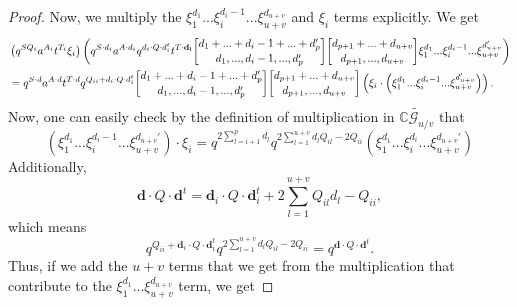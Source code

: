 \documentclass[10pt,a4paper]{amsart}
\begin{document}
\begin{proof}
    Now, we multiply the $\xi_1^{d_1}...\xi_i^{d_i-1}...\xi_{u+v}^{d_{u+v}}$ and $\xi_i$ terms explicitly. We get
    \begin{align*}
    &\left(q^{SQ_i}a^{A_i}t^{T_i}\xi_i\right)\left(q^{S\cdot\textbf{d}_i }a^{A\cdot \textbf{d}_i}q^{\textbf{d}_i\cdot Q\cdot \textbf{d}_i^t} t^{T\cdot\bf{d}_i} {d_1+...+d_i-1+...+d_p'\brack d_1,...,d_i-1,...,d_p'}{d_{p+1}+...+d_{u+v}\brack d_{p+1},...,d_{u+v}}\xi_1^{d_1}...\xi_i^{d_i-1} ...\xi_{u+v}^{d_{u+v}'}\right) \\
    & =q^{S\cdot \textbf{d}}a^{A\cdot \textbf{d}}t^{T\cdot \textbf{d}}q^{Q_{ii}+\textbf{d}_i\cdot Q\cdot \textbf{d}_i^t}{d_1+...+d_i-1+...+d_p'\brack d_1,...,d_i-1,...,d_p'}{d_{p+1}+...+d_{u+v}\brack d_{p+1},...,d_{u+v}}\left(\xi_i\cdot\left(\xi_1^{d_1}...\xi_i^{d_i-1} ...\xi_{u+v}^{d_{u+v}'}\right)\right).
    \end{align*}
    Now, one can easily check by the definition of multiplication in $\widetilde{\mathbb{C}\mathcal{G}_{u/v}}$ that
    \[
    \left(\xi_1^{d_1}...\xi_i^{d_i-1} ...\xi_{u+v}^{d_{u+v}'}\right)\cdot \xi_i=q^{2\sum_{l=i+1}^p d_l}q^{2\sum_{l=1}^{u+v}d_lQ_{il}-2Q_{ii}}\left(\xi_1^{d_1}...\xi_i^{d_i} ...\xi_{u+v}^{d_{u+v}'}\right)
    \]
    Additionally,
    \[
    \textbf{d}\cdot Q\cdot \textbf{d}^t = \textbf{d}_i\cdot Q\cdot \textbf{d}_i^t+ 2\sum_{l=1}^{u+v}Q_{il}d_l-Q_{ii},
    \]
    which means
    \[
    q^{Q_{ii}+\textbf{d}_i\cdot Q\cdot \textbf{d}_i^t}q^{2\sum_{l=1}^{u+v}d_lQ_{il}-2Q_{ii}}=q^{\textbf{d}\cdot Q \cdot \textbf{d}^t}.
    \]
    Thus, if we add the $u+v$ terms that we get from the multiplication that contribute to the $\xi_1^{d_1}...\xi_{u+v}^{d_{u+v}}$ term, we get



\end{proof}
\end{document}

